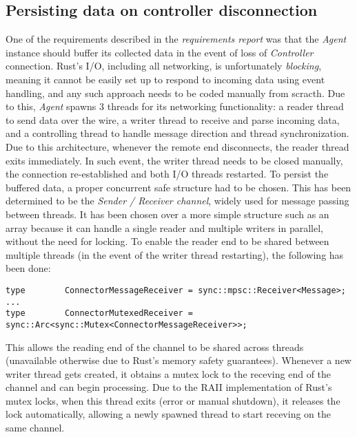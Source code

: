 \documentclass[12pt,a4paper,table]{article}
\begin{document}
        \subsection{Persisting data on controller disconnection}
            One of the requirements described in the \textit{requirements report} was that the \textit{Agent} instance should buffer its collected data in the event of loss of \textit{Controller} connection. Rust's I/O, including all networking, is unfortunately \textit{blocking}, meaning it cannot be easily set up to respond to incoming data using event handling, and any such approach needs to be coded manually from scracth. Due to this, \textit{Agent} spawns 3 threads for its networking functionality: a reader thread to send data over the wire, a writer thread to receive and parse incoming data, and a controlling thread to handle message direction and thread synchronization. Due to this architecture, whenever the remote end disconnects, the reader thread exits immediately. In such event, the writer thread needs to be closed manually, the connection re-established and both I/O threads restarted. To persist the buffered data, a proper concurrent safe structure had to be chosen. This has been determined to be the \textit{Sender / Receiver channel}, widely used for message passing between threads. It has been chosen over a more simple structure such as an array because it can handle a single reader and multiple writers in parallel, without the need for locking. To enable the reader end to be shared between multiple threads (in the event of the writer thread restarting), the following has been done:
\begin{verbatim}
type        ConnectorMessageReceiver = sync::mpsc::Receiver<Message>;
...
type        ConnectorMutexedReceiver = sync::Arc<sync::Mutex<ConnectorMessageReceiver>>;
\end{verbatim}

            This allows the reading end of the channel to be shared across threads (unavailable otherwise due to Rust's memory safety guarantees). Whenever a new writer thread gets created, it obtains a mutex lock to the receving end of the channel and can begin processing. Due to the RAII implementation of Rust's mutex locks, when this thread exits (error or manual shutdown), it releases the lock automatically, allowing a newly spawned thread to start receving on the same channel.
\end{document}
